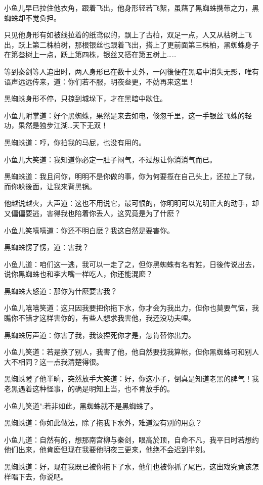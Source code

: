 \documentclass[12pt,oneside]{book}
\begin{document}
小鱼儿早已拉住他衣角，跟着飞出，他身形轻若飞絮，虽藉了黑蜘蛛携带之力，黑蜘蛛却不觉负担。

只见他身形有如被线拉着的纸鸢似的，飘上了古柏，双足一点，人又从枯树上飞出，跃上第二株柏树，那根银丝也跟着飞出，搭上了更前面第三株柏，黑蜘蛛身子在第叁树上一点，跃上第四株，银丝又搭在第五树上\ldots\ldots{}

等到秦剑等人追出时，两人身形已在数十丈外，一闪後便在黑暗中消失无影，唯有语声远远传来，道：你们若不服，明夜叁更，不妨再来这里！

黑蜘蛛身形不停，只掠到城垛下，才在黑暗中歇住。

小鱼儿附掌道：好个黑蜘蛛，果然是来去如电，倏忽千里，这一手银丝飞蛛的轻功，果然是独步江湖\ldots 天下无双！

黑蜘蛛道：哼，你拍我的马屁，也没有用的。

小鱼儿大笑道：我知道你必定一肚子闷气，不过想让你消消气而已。

黑蜘蛛道：我且问你，明明不是你做的事，你为何要揽在自己头上，还拉上了我，而你躲後面，让我来背黑锅。

他越说越火，大声道：这也不用说它，最可恨的，你明明可以光明正大的动手，却又偏偏要逃，害得我也陪着你丢人，这究竟是为了什麽？

小鱼儿笑嘻嘻道：你还不明白麽？我这自然是要害你。

黑蜘蛛愣了愣，道：害我？

小鱼儿道：咱们这一逃，我可以一走了之，但你黑蜘蛛有名有姓，日後传说出去，说你黑蜘蛛也和李大嘴一样吃人，你还能混麽？

黑蜘蛛大怒道：那你为什麽要害我？

小鱼儿嘻嘻笑道：这只因我要把你拖下水，你才会为我出力，但你也莫要气恼，我瞧你不错才这样害你的，有些人想求我害他，我还没功夫哩。

黑蜘蛛厉声道：你害了我，我该捏死你才是，怎肯替你出力。

小鱼儿笑道：若是换了别人，我害了他，他自然要找我算帐，但你黑蜘蛛可和别人大不相同？这一点我清楚得很。

黑蜘蛛瞪了他半晌，突然放手大笑道：好，你这小子，倒真是知道老黑的脾气！我老黑遇着这种怪事，的确是明知上当，也不肯放手的。

小鱼儿笑道":若非如此，黑蜘蛛就不是黑蜘蛛了。

黑蜘蛛道：你如此做法，除了拖我下水外，难道没有别的用意？

小鱼儿道：自然有的，想那南宫柳与秦剑，眼高於顶，自命不凡，我平日时若想约他们出来，他肯麽但现在我要他明夜三更来，他绝不会迟到半刻。

黑蜘蛛道：好，现在我既已被你拖下了水，他们也被你抓了尾巴，这出戏究竟该怎样唱下去，你说吧。
\end{document}
